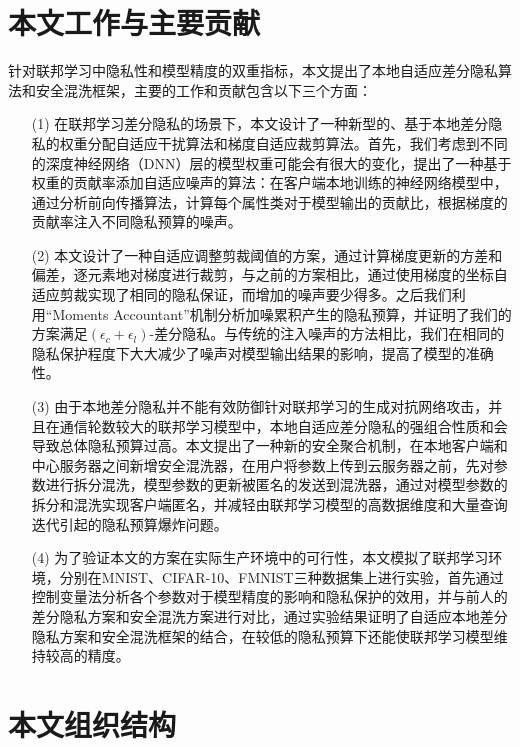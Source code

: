 \section{本文工作与主要贡献}
针对联邦学习中隐私性和模型精度的双重指标，本文提出了本地自适应差分隐私算法和安全混洗框架，主要的工作和贡献包含以下三个方面：
\begin{enumerate}
\item [(1)] 在联邦学习差分隐私的场景下，本文设计了一种新型的、基于本地差分隐私的权重分配自适应干扰算法和梯度自适应裁剪算法。首先，我们考虑到不同的深度神经网络（DNN）层的模型权重可能会有很大的变化，提出了一种基于权重的贡献率添加自适应噪声的算法：在客户端本地训练的神经网络模型中，通过分析前向传播算法，计算每个属性类对于模型输出的贡献比，根据梯度的贡献率注入不同隐私预算的噪声。

\item [(2)] 本文设计了一种自适应调整剪裁阈值的方案，通过计算梯度更新的方差和偏差，逐元素地对梯度进行裁剪，与之前的方案相比，通过使用梯度的坐标自适应剪裁实现了相同的隐私保证，而增加的噪声要少得多。之后我们利用“Moments Accountant”机制分析加噪累积产生的隐私预算，并证明了我们的方案满足$\left(\epsilon_{c}+\epsilon_{l}\right)$-差分隐私。与传统的注入噪声的方法相比，我们在相同的隐私保护程度下大大减少了噪声对模型输出结果的影响，提高了模型的准确性。

\item [(3)] 由于本地差分隐私并不能有效防御针对联邦学习的生成对抗网络攻击，并且在通信轮数较大的联邦学习模型中，本地自适应差分隐私的强组合性质和会导致总体隐私预算过高。本文提出了一种新的安全聚合机制，在本地客户端和中心服务器之间新增安全混洗器，在用户将参数上传到云服务器之前，先对参数进行拆分混洗，模型参数的更新被匿名的发送到混洗器，通过对模型参数的拆分和混洗实现客户端匿名，并减轻由联邦学习模型的高数据维度和大量查询迭代引起的隐私预算爆炸问题。

\item [(4)] 为了验证本文的方案在实际生产环境中的可行性，本文模拟了联邦学习环境，分别在MNIST、CIFAR-10、FMNIST三种数据集上进行实验，首先通过控制变量法分析各个参数对于模型精度的影响和隐私保护的效用，并与前人的差分隐私方案和安全混洗方案进行对比，通过实验结果证明了自适应本地差分隐私方案和安全混洗框架的结合，在较低的隐私预算下还能使联邦学习模型维持较高的精度。
\end{enumerate}

\section{本文组织结构}

